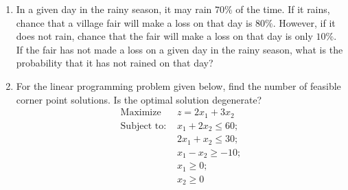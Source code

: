\documentclass[journal,12pt,onecolumn]{IEEEtran}
\theoremstyle{remark}
\begin{document}
\begin{enumerate}
    \item In a given day in the rainy season, it may rain $70\%$ of the time. If it rains, chance that a village fair will make a loss on that day is $80\%$. However, if it does not rain, chance that the fair will make a loss on that day is only $10\%$. If the fair has not made a loss on a given day in the rainy season, what is the probability that it has not rained on that day?
    
    \hfill{}
    \begin{enumerate}
    \end{enumerate}

    \item For the linear programming problem given below, find the number of feasible corner point solutions. Is the optimal solution degenerate?
    \begin{align*}
        \text{Maximize } & z = 2x_1 + 3x_2 \\
        \text{Subject to: } & x_1 + 2x_2 \leq 60; \\
        & 2x_1 + x_2 \leq 30; \\
        & x_1 - x_2 \geq -10; \\
        & x_1 \geq 0; \\
        & x_2 \geq 0
    \end{align*}
    
    \hfill{}
    \begin{enumerate}
    \end{enumerate}


\end{enumerate}
\end{document}
